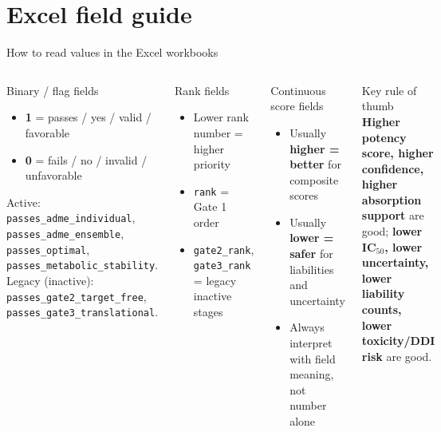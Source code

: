 \documentclass[aspectratio=169,10pt]{beamer}
\begin{document}
\section{Excel field guide}

\begin{frame}{How to read values in the Excel workbooks}
  \small
  \begin{columns}[T]
      \begin{block}{Binary / flag fields}
        \begin{itemize}
          \item \textbf{1} = passes / yes / valid / favorable
          \item \textbf{0} = fails / no / invalid / unfavorable
        \end{itemize}
        Active: \texttt{passes\_adme\_individual}, \texttt{passes\_adme\_ensemble},
        \texttt{passes\_optimal}, \texttt{passes\_metabolic\_stability}.\\
        Legacy (inactive): \texttt{passes\_gate2\_target\_free},
        \texttt{passes\_gate3\_translational}.
      \end{block}
      \begin{block}{Rank fields}
        \begin{itemize}
          \item Lower rank number = higher priority
          \item \texttt{rank} = Gate 1 order
          \item \texttt{gate2\_rank}, \texttt{gate3\_rank} = legacy inactive stages
        \end{itemize}
      \end{block}
      \begin{block}{Continuous score fields}
        \begin{itemize}
          \item Usually \textbf{higher = better} for composite scores
          \item Usually \textbf{lower = safer} for liabilities and uncertainty
          \item Always interpret with field meaning, not number alone
        \end{itemize}
      \end{block}
      \begin{exampleblock}{Key rule of thumb}
        \textbf{Higher potency score, higher confidence, higher absorption support}
        are good; \textbf{lower IC\(_{50}\), lower uncertainty, lower liability counts,
        lower toxicity/DDI risk} are good.
      \end{exampleblock}
  \end{columns}
\end{frame}
\end{document}
